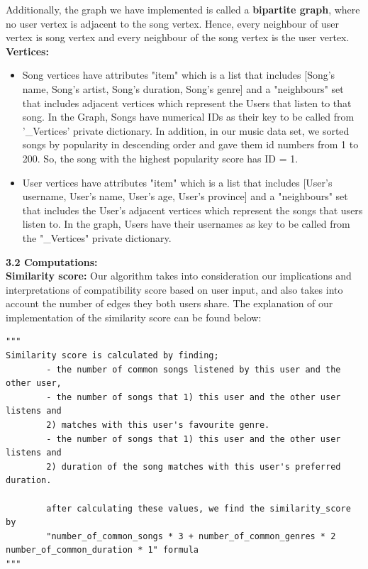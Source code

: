 \documentclass[fontsize=11pt]{article}
\numberwithin{equation}{section}
\theoremstyle{plain} %
\theoremstyle{definition}
\theoremstyle{remark}
\begin{document}
Additionally, the graph we have implemented is called a \textbf{bipartite graph}, where no user vertex is adjacent to the song vertex. Hence, every neighbour of user vertex is song vertex and every neighbour of the song vertex is the user vertex.
\\

\textbf{Vertices:}
\begin{itemize}
\item Song vertices have attributes "item" which is a list that includes [Song's name, Song's artist, Song's duration, Song's genre] and a "neighbours" set that includes adjacent vertices which represent the Users that listen to that song. In the Graph, Songs have numerical IDs as their key to be called from '\_Vertices' private dictionary. In addition, in our music data set, we sorted songs by popularity in descending order and gave them id numbers from 1 to 200. So, the song with the highest popularity score has ID = 1.

\item User vertices have attributes "item" which is a list that includes [User's username, User's name, User's age, User's province] and a "neighbours" set that includes the User's adjacent vertices which represent the songs that users listen to. In the graph, Users have their usernames as key to be called from the "\_Vertices" private dictionary.
\end{itemize}
\textbf{3.2 Computations:}
\\

\textbf{Similarity score:}
Our algorithm takes into consideration our implications and interpretations of compatibility score based on user input, and also takes into account the number of edges they both users share. The explanation of our implementation of the similarity score can be found below:
\\
\begin{verbatim}
"""
Similarity score is calculated by finding;
        - the number of common songs listened by this user and the other user,
        - the number of songs that 1) this user and the other user listens and
        2) matches with this user's favourite genre.
        - the number of songs that 1) this user and the other user listens and
        2) duration of the song matches with this user's preferred duration.

        after calculating these values, we find the similarity_score by
        "number_of_common_songs * 3 + number_of_common_genres * 2 number_of_common_duration * 1" formula
"""
\end{verbatim}
\end{document}
